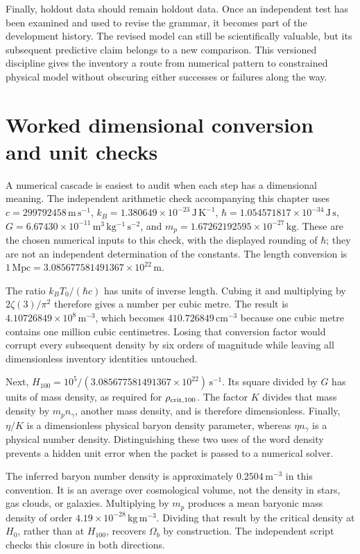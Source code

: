 Finally, holdout data should remain holdout data. Once an independent test has been examined and used to revise the grammar, it becomes part of the development history. The revised model can still be scientifically valuable, but its subsequent predictive claim belongs to a new comparison. This versioned discipline gives the inventory a route from numerical pattern to constrained physical model without obscuring either successes or failures along the way.

\section{Worked dimensional conversion and unit checks}
A numerical cascade is easiest to audit when each step has a dimensional meaning. The independent arithmetic check accompanying this chapter uses $c=299792458\,\mathrm{m\,s^{-1}}$, $k_B=1.380649\times10^{-23}\,\mathrm{J\,K^{-1}}$, $\hbar=1.054571817\times10^{-34}\,\mathrm{J\,s}$, $G=6.67430\times10^{-11}\,\mathrm{m^3\,kg^{-1}\,s^{-2}}$, and $m_p=1.67262192595\times10^{-27}\,\mathrm{kg}$. These are the chosen numerical inputs to this check, with the displayed rounding of $\hbar$; they are not an independent determination of the constants. The length conversion is $1\,\mathrm{Mpc}=3.085677581491367\times10^{22}\,\mathrm m$.

The ratio $k_BT_0/(\hbar c)$ has units of inverse length. Cubing it and multiplying by $2\zeta(3)/\pi^2$ therefore gives a number per cubic metre. The result is $4.10726849\times10^8\,\mathrm{m^{-3}}$, which becomes $410.726849\,\mathrm{cm^{-3}}$ because one cubic metre contains one million cubic centimetres. Losing that conversion factor would corrupt every subsequent density by six orders of magnitude while leaving all dimensionless inventory identities untouched.

Next, $H_{100}=10^5/(3.085677581491367\times10^{22})\,\mathrm{s^{-1}}$. Its square divided by $G$ has units of mass density, as required for $\rho_{\rm crit,100}$. The factor $K$ divides that mass density by $m_pn_\gamma$, another mass density, and is therefore dimensionless. Finally, $\eta/K$ is a dimensionless physical baryon density parameter, whereas $\eta n_\gamma$ is a physical number density. Distinguishing these two uses of the word density prevents a hidden unit error when the packet is passed to a numerical solver.

The inferred baryon number density is approximately $0.2504\,\mathrm{m^{-3}}$ in this convention. It is an average over cosmological volume, not the density in stars, gas clouds, or galaxies. Multiplying by $m_p$ produces a mean baryonic mass density of order $4.19\times10^{-28}\,\mathrm{kg\,m^{-3}}$. Dividing that result by the critical density at $H_0$, rather than at $H_{100}$, recovers $\Omega_b$ by construction. The independent script checks this closure in both directions.

